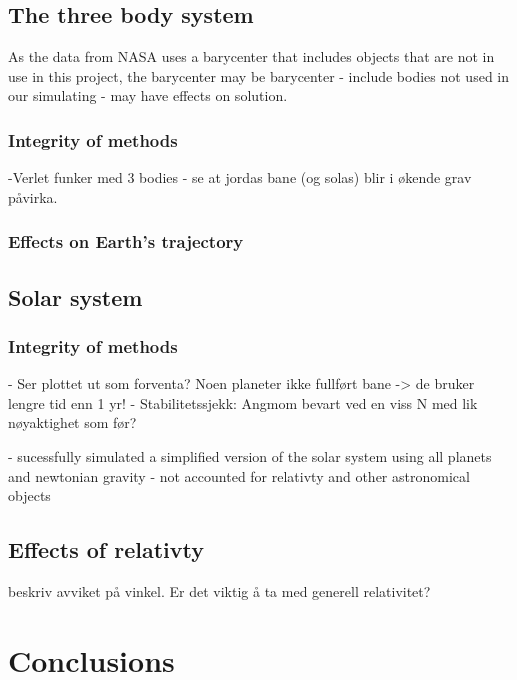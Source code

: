 \documentclass[%
oneside,                 %
final,                   %
10pt]{article}
\begin{document}
\subsection{The three body system}
\label{subsec:Discofres:3B}
As the data from NASA uses a barycenter that includes objects that are not in use in this project, the barycenter may be 
barycenter - include bodies not used in our simulating - may have effects on solution.
\subsubsection{Integrity of methods}
-Verlet funker med 3 bodies
- se at jordas bane (og solas) blir i økende grav påvirka.
\subsubsection{Effects on Earth's trajectory}

\subsection{Solar system}
\subsubsection{Integrity of methods}
- Ser plottet ut som forventa? Noen planeter ikke fullført bane -> de bruker lengre tid enn 1 yr!
- Stabilitetssjekk: Angmom bevart ved en viss N med lik nøyaktighet som før?

- sucessfully simulated a simplified version of the solar system using all planets and newtonian gravity - not accounted for relativty and other astronomical objects 
\subsection{Effects of relativty}
beskriv avviket på vinkel. Er det viktig å ta med generell relativitet?
\section{Conclusions}



\end{document}
